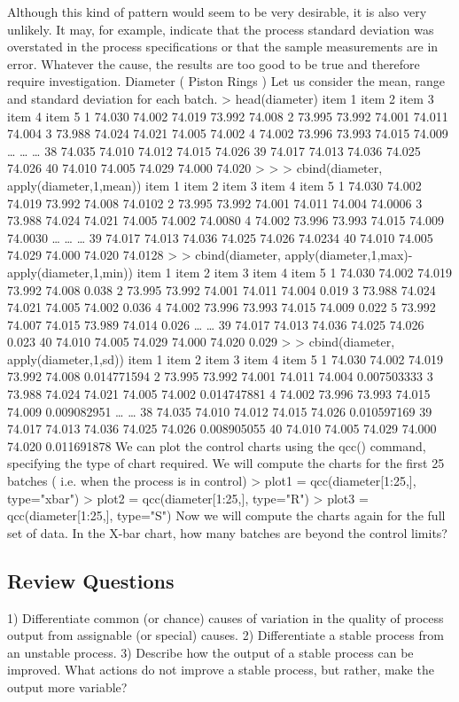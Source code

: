 Although this kind of pattern would seem to be very desirable, it is also very unlikely. It may, for example, indicate that the process standard deviation was overstated in the process specifications or that the sample measurements are in error. Whatever the cause, the results are too good to be true and therefore require investigation.
Diameter ( Piston Rings ) Let us consider the mean, range and standard deviation for each batch. > head(diameter) item 1 item 2 item 3 item 4 item 5 1 74.030 74.002 74.019 73.992 74.008 2 73.995 73.992 74.001 74.011 74.004 3 73.988 74.024 74.021 74.005 74.002 4 74.002 73.996 73.993 74.015 74.009 … … … 38 74.035 74.010 74.012 74.015 74.026 39 74.017 74.013 74.036 74.025 74.026 40 74.010 74.005 74.029 74.000 74.020 > > > cbind(diameter, apply(diameter,1,mean)) item 1 item 2 item 3 item 4 item 5 1 74.030 74.002 74.019 73.992 74.008 74.0102 2 73.995 73.992 74.001 74.011 74.004 74.0006 3 73.988 74.024 74.021 74.005 74.002 74.0080 4 74.002 73.996 73.993 74.015 74.009 74.0030 … … … 39 74.017 74.013 74.036 74.025 74.026 74.0234 40 74.010 74.005 74.029 74.000 74.020 74.0128 > > cbind(diameter, apply(diameter,1,max)-apply(diameter,1,min)) item 1 item 2 item 3 item 4 item 5 1 74.030 74.002 74.019 73.992 74.008 0.038 2 73.995 73.992 74.001 74.011 74.004 0.019 3 73.988 74.024 74.021 74.005 74.002 0.036 4 74.002 73.996 73.993 74.015 74.009 0.022 5 73.992 74.007 74.015 73.989 74.014 0.026 … … 39 74.017 74.013 74.036 74.025 74.026 0.023 40 74.010 74.005 74.029 74.000 74.020 0.029 > > cbind(diameter, apply(diameter,1,sd)) item 1 item 2 item 3 item 4 item 5 1 74.030 74.002 74.019 73.992 74.008 0.014771594 2 73.995 73.992 74.001 74.011 74.004 0.007503333 3 73.988 74.024 74.021 74.005 74.002 0.014747881 4 74.002 73.996 73.993 74.015 74.009 0.009082951 … … 38 74.035 74.010 74.012 74.015 74.026 0.010597169 39 74.017 74.013 74.036 74.025 74.026 0.008905055 40 74.010 74.005 74.029 74.000 74.020 0.011691878
We can plot the control charts using the qcc() command, specifying the type of chart required.
We will compute the charts for the first 25 batches ( i.e. when the process is in control) > plot1 = qcc(diameter[1:25,], type="xbar") > plot2 = qcc(diameter[1:25,], type="R") > plot3 = qcc(diameter[1:25,], type="S")
Now we will compute the charts again for the full set of data. In the X-bar chart, how many batches are beyond the control limits?
\subsection{Review Questions}
1) Differentiate common (or chance) causes of variation in the quality of process output from assignable (or special) causes.
2) Differentiate a stable process from an unstable process.
3) Describe how the output of a stable process can be improved. What actions do not improve a stable process, but rather, make the output more variable?
